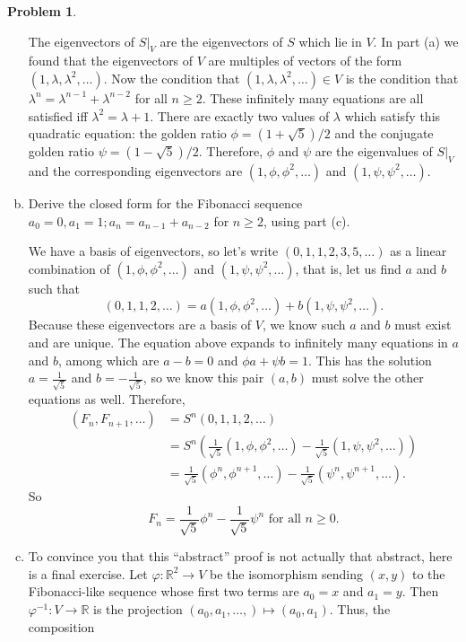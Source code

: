 \documentclass[11pt,oneside]{amsart}
\theoremstyle{definition}
\newtheorem{problem}{Problem}
\newcommand{\bR}{\mathbb{R}}
\begin{document}
\begin{problem}
\begin{enumerate}[(a)]
\begin{solution}
                The eigenvectors of $S|_V$ are the eigenvectors of $S$ which lie in $V$. In part (a) we found that the eigenvectors of $V$ are multiples of vectors of the form $(1,\lambda,\lambda^2,\dots)$. Now the condition that $(1,\lambda,\lambda^2,\dots)\in V$ is the condition that $\lambda^n=\lambda^{n-1}+\lambda^{n-2}$ for all $n\geq 2$. These infinitely many equations are all satisfied iff $\lambda^2=\lambda+1$. There are exactly two values of $\lambda$ which satisfy this quadratic equation: the golden ratio $\phi=(1+\sqrt 5)/2$ and the conjugate golden ratio $\psi=(1-\sqrt 5)/2$. Therefore, $\phi$ and $\psi$ are the eigenvalues of $S|_V$ and the corresponding eigenvectors are $(1,\phi,\phi^2,\dots)$ and $(1,\psi,\psi^2,\dots)$.
            \end{solution}
            \item Derive the closed form for the Fibonacci sequence $a_0=0,a_1=1; a_n=a_{n-1}+a_{n-2}$ for $n\geq 2$, using part (c).
            \begin{solution}
                We have a basis of eigenvectors, so let's write $(0,1,1,2,3,5,\dots)$ as a linear combination of $(1,\phi,\phi^2,\dots)$ and $(1,\psi,\psi^2,\dots)$, that is, let us find $a$ and $b$ such that
                \[(0,1,1,2,\dots)=a(1,\phi,\phi^2,\dots)+b(1,\psi,\psi^2,\dots).\]
                Because these eigenvectors are a basis of $V$, we know such $a$ and $b$ must exist and are unique. The equation above expands to infinitely many equations in $a$ and $b$, among which are $a-b=0$ and $\phi a+\psi b=1$. This has the solution $a=\frac 1{\sqrt 5}$ and $b=-\frac 1{\sqrt5}$, so we know this pair $(a,b)$ must solve the other equations as well. Therefore,
                \[\begin{split}
                    (F_n,F_{n+1},\dots) &=S^n(0,1,1,2,\dots)\\
                    &= S^n\left(\frac 1{\sqrt5}(1,\phi,\phi^2,\dots)-\frac 1{\sqrt5}(1,\psi,\psi^2,\dots)\right)\\
                    &=\frac 1{\sqrt5}(\phi^n,\phi^{n+1},\dots)-\frac 1{\sqrt5}(\psi^n,\psi^{n+1},\dots).
                \end{split}\]
                So
                \[F_n=\frac 1{\sqrt 5}\phi^n-\frac 1{\sqrt5}\psi^n\text{ for all $n\geq 0$}.\]
            \end{solution}
            \item To convince you that this ``abstract'' proof is not actually that abstract, here is a final exercise. Let $\varphi\colon\bR^2\to V$ be the isomorphism sending $(x,y)$ to the Fibonacci-like sequence whose first two terms are $a_0=x$ and $a_1=y$. Then $\varphi^{-1}\colon V\to\bR$ is the projection $(a_0,a_1,\dots,)\mapsto (a_0,a_1)$. Thus, the composition

\end{enumerate}
\end{problem}
\end{document}
